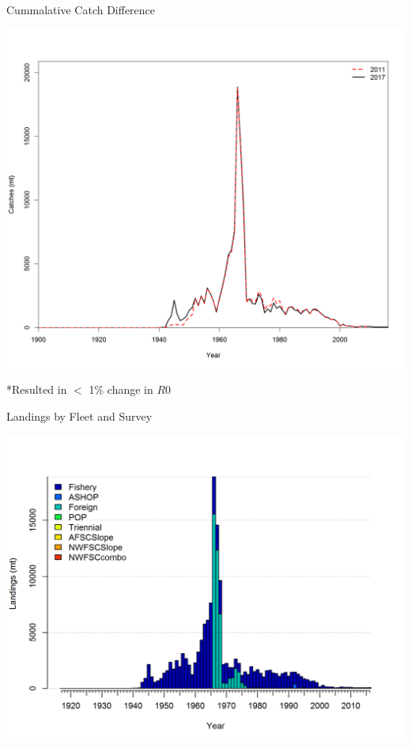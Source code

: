 \documentclass[pdf]{beamer}\usepackage[]{graphicx}\usepackage[]{color}
\begin{document}
\begin{frame}{Cummalative Catch Difference}
  \begin{center}
    \includegraphics[scale = 0.32, trim={0, 0, 0, 2cm}, clip]{figures/Catch_Comparison.png}
  \end{center}
  *Resulted in $<$ 1\% change in $R0$ 
\end{frame}


\begin{frame}{Landings by Fleet and Survey}
  \begin{center}
    \includegraphics[scale = 0.60]{figures/catch2_landings_stacked.png}
  \end{center}
\end{frame}
\end{document}
